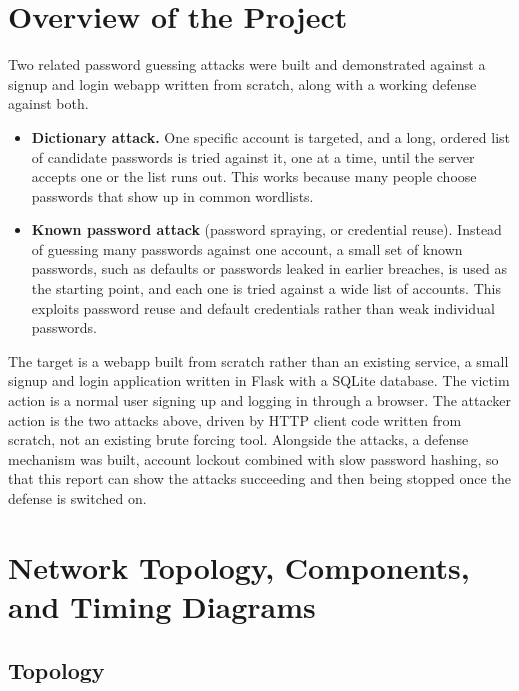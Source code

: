 \documentclass[11pt]{article}
\begin{document}
\section{Overview of the Project}
\label{sec:overview}

Two related password guessing attacks were built and demonstrated against a
signup and login webapp written from scratch, along with a working
defense against both.

\begin{itemize}[leftmargin=*]
  \item \textbf{Dictionary attack.} One specific account is targeted, and a
    long, ordered list of candidate passwords is tried against it, one at a time,
    until the server accepts one or the list runs out. This works because
    many people choose passwords that show up in common wordlists.
  \item \textbf{Known password attack} (password spraying, or credential
    reuse). Instead of guessing many passwords against one account, a small
    set of known passwords, such as defaults or passwords leaked in earlier
    breaches, is used as the starting point, and each one is tried against a
    wide list of accounts. This exploits password reuse and default
    credentials rather than weak individual passwords.
\end{itemize}

The target is a webapp built from scratch rather than an existing
service, a small signup and login application written in Flask with a
SQLite database. The victim action is a normal user signing up and logging
in through a browser. The attacker action is the two attacks above, driven
by HTTP client code written from scratch, not an existing brute forcing tool.
Alongside the attacks, a defense mechanism was built, account lockout
combined with slow password hashing, so that this report can show the
attacks succeeding and then being stopped once the defense is switched on.

\section{Network Topology, Components, and Timing Diagrams}
\label{sec:topology}

\subsection{Topology}
\end{document}
